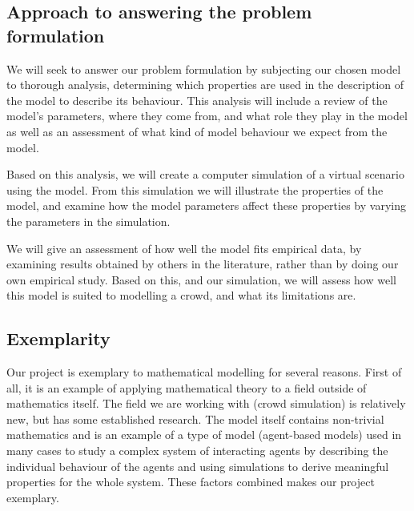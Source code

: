 \subsection{Approach to answering the problem formulation}
We will seek to answer our problem formulation by subjecting our chosen model 
to thorough analysis, determining which properties are used in the description 
of the model to describe its behaviour. This analysis will include a review of 
the model's parameters, where they come from, and what role they play in the 
model as well as an assessment of what kind of model behaviour we expect from 
the model.

Based on this analysis, we will create a computer simulation of a virtual 
scenario using the model. From this simulation we will illustrate the 
properties of the model, and examine how the model parameters affect these 
properties by varying the parameters in the simulation.

We will give an assessment of how well the model fits empirical data, by 
examining results obtained by others in the literature, rather than by doing 
our own empirical study. Based on this, and our simulation, we will assess how 
well this model is suited to modelling a crowd, and what its limitations are.

\subsection{Exemplarity}
Our project is exemplary to mathematical modelling for several reasons. First 
of all, it is an example of applying mathematical theory to a field outside of 
mathematics itself. The field we are working with (crowd simulation) is 
relatively new, but has some established research. The model itself contains 
non-trivial mathematics and is an example of a type of model (agent-based 
models) used in many cases to study a complex system of interacting agents by 
describing the individual behaviour of the agents and using simulations to 
derive meaningful properties for the whole system. These factors combined 
makes our project exemplary.
